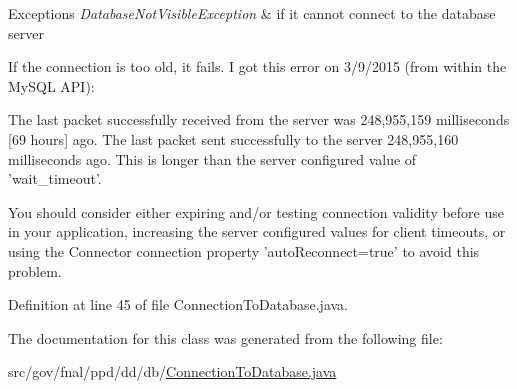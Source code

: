 \begin{DoxyExceptions}{Exceptions}
{\em Database\-Not\-Visible\-Exception} & if it cannot connect to the database server \\
\hline
\end{DoxyExceptions}
If the connection is too old, it fails. I got this error on 3/9/2015 (from within the My\-S\-Q\-L A\-P\-I)\-:


\begin{DoxyPre}
The last packet successfully received from the server was 248,955,159 milliseconds [69 hours] ago. 
The last packet sent successfully to the server 248,955,160 milliseconds ago. 
This is longer than the server configured value of 'wait\_timeout'.\end{DoxyPre}



\begin{DoxyPre}You should consider either expiring and/or testing connection validity before use in your application,
increasing the server configured values for client timeouts, or using the Connector connection property
'autoReconnect=true' to avoid this problem.
\end{DoxyPre}


Definition at line 45 of file Connection\-To\-Database.\-java.



The documentation for this class was generated from the following file\-:\begin{DoxyCompactItemize}
\item 
src/gov/fnal/ppd/dd/db/\hyperlink{ConnectionToDatabase_8java}{Connection\-To\-Database.\-java}\end{DoxyCompactItemize}
